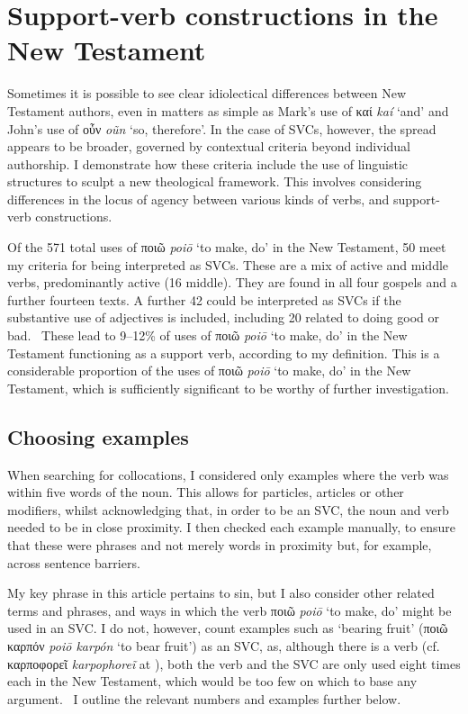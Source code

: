 \documentclass[output=paper,colorlinks,citecolor=brown]{langscibook}
\begin{document}
\hypertarget{svcs-in-the-new-testament}{%
\section{Support-verb constructions in the New Testament}\label{svcs-in-the-new-testamentCR}}

Sometimes it is possible to see clear idiolectical differences between New
Testament authors, even in matters as simple as Mark's use of καί
\textit{kaí} ‘and' and John's use of οὖν \textit{oũn} ‘so, therefore'. In the case
of SVCs, however, the spread appears to be broader, governed by
contextual criteria beyond individual authorship. 
I demonstrate
how these criteria include the use of linguistic structures to sculpt a
new theological framework. 
This involves considering differences in the
locus of agency between various kinds of verbs, and support-verb
constructions.~

Of the 571 total uses of ποιῶ \textit{poiō} ‘to make, do' in the New Testament, 50 meet my criteria
for being interpreted as SVCs. 
These are a mix of active and middle
verbs, predominantly active (16 middle). 
They are found in all four
gospels and a further fourteen texts. 
A further 42 could be interpreted
as SVCs if the substantive use of adjectives is included, including 20
related to doing good or bad.
~These lead to 9--12\% of uses of ποιῶ \textit{poiō} ‘to make, do' in
the New Testament functioning as a support verb, according to my
definition. 
This is a considerable proportion of the uses of ποιῶ \textit{poiō} ‘to make, do' in the New
Testament, which is sufficiently significant to be worthy of further
investigation.~

\subsection{Choosing examples}\label{choosing-examples}

When searching for collocations, I considered only examples where the
verb was within five words of the noun. 
This allows for particles,
articles or other modifiers, whilst acknowledging that, in order to be
an SVC, the noun and verb needed to be in close proximity. 
I then
checked each example manually, to ensure that these were phrases and not
merely words in proximity but, for example, across sentence barriers.~

My key phrase in this article pertains to sin, but I also consider other
related terms and phrases, and ways in which the verb ποιῶ \textit{poiō} ‘to make, do' might be used
in an SVC. 
I do not, however, count examples such as `bearing fruit'
(ποιῶ καρπόν \textit{poiō karpón} ‘to bear fruit') as an SVC, as, although there is a verb (cf. καρποφορεῖ \textit{karpophoreĩ} at
), both the verb and the SVC are
only used eight times each in the New Testament, which would be too few
on which to base any argument.~
I outline the relevant numbers and
examples further below.
\end{document}
